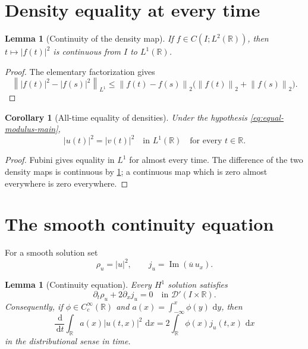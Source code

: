 \documentclass[11pt,oneside]{book}
\newtheorem{lemma}[theorem]{Lemma}
\newtheorem{corollary}[theorem]{Corollary}
\theoremstyle{definition}
\theoremstyle{remark}
\newcommand{\R}{\mathbb R}
\newcommand{\D}{\mathcal D}
\newcommand{\1}{\mathbf 1}
\newcommand{\Ima}{\operatorname{Im}}
\newcommand{\dd}{\,\mathrm d}
\newcommand{\norm}[1]{\left\lVert #1\right\rVert}
\begin{document}
\section{Density equality at every time}

\begin{lemma}[Continuity of the density map]\label{lem:density-continuity}
If $f\in C(I;L^2(\R))$, then $t\mapsto|f(t)|^2$ is continuous from $I$ to
$L^1(\R)$.
\end{lemma}

\begin{proof}
The elementary factorization gives
\[
 \norm{|f(t)|^2-|f(s)|^2}_{L^1}
 \le\norm{f(t)-f(s)}_2\big(\norm{f(t)}_2+\norm{f(s)}_2\big).
\]
\end{proof}

\begin{corollary}[All-time equality of densities]\label{cor:all-time-density}
Under the hypothesis \eqref{eq:equal-modulus-main},
\begin{equation}
 |u(t)|^2=|v(t)|^2\quad\text{in }L^1(\R)
 \quad\text{for every }t\in\R.                    \label{eq:all-time-density}
\end{equation}
\end{corollary}

\begin{proof}
Fubini gives equality in $L^1$ for almost every time.  The difference of the
two density maps is continuous by \cref{lem:density-continuity}; a continuous
map which is zero almost everywhere is zero everywhere.
\end{proof}

\section{The smooth continuity equation}
For a smooth solution set
\[
 \rho_u=|u|^2,
 \qquad j_u=\Ima(\overline u\,u_x).
\]

\begin{lemma}[Continuity equation]\label{lem:continuity-smooth}
Every $H^1$ solution satisfies
\begin{equation}
  \partial_t\rho_u+2\partial_xj_u=0
  \quad\text{in }\D'(I\times\R).                  \label{eq:continuity-eq}
\end{equation}
Consequently, if $\phi\in C_c^\infty(\R)$ and
$a(x)=\int_{-\infty}^x\phi(y)\,\dd y$, then
\begin{equation}
 \frac{\dd}{\dd t}\int_\R a(x)|u(t,x)|^2\,\dd x
 =2\int_\R\phi(x)j_u(t,x)\,\dd x                 \label{eq:localized-mass-smooth}
\end{equation}
in the distributional sense in time.
\end{lemma}
\end{document}
